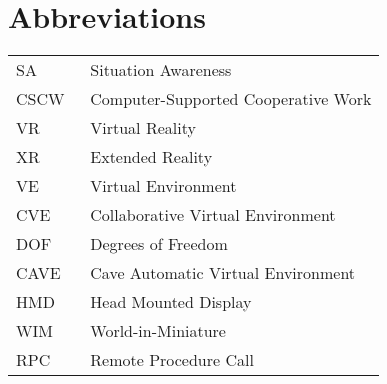 \chapter*{Abbreviations}

\begin{flushleft}
\begin{tabular}{l p{0.8\linewidth}}
SA      & Situation Awareness \\
CSCW    & Computer-Supported Cooperative Work \\
VR      & Virtual Reality \\
XR      & Extended Reality \\
VE      & Virtual Environment \\
CVE     & Collaborative Virtual Environment \\
DOF     & Degrees of Freedom \\
CAVE    & Cave Automatic Virtual Environment \\
HMD     & Head Mounted Display \\
WIM     & World-in-Miniature \\
RPC     & Remote Procedure Call \\
\end{tabular}
\end{flushleft}

